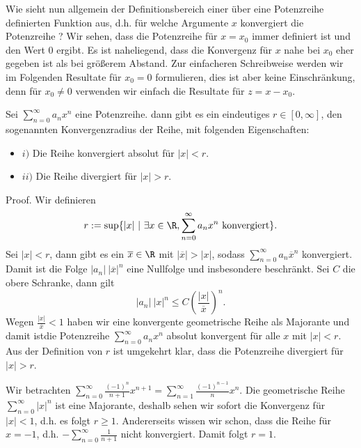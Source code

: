 \documentclass[letterpaper,10pt,english]{jupyterBook}
\begin{document}
Wie sieht nun allgemein der Definitionsbereich einer über eine Potenzreihe definierten Funktion aus, d.h. für welche Argumente \(x\) konvergiert die Potenzreihe ? Wir sehen, dass die Potenzreihe für \(x=x_0\) immer definiert ist und den Wert \(0\) ergibt. Es ist naheliegend, dass die Konvergenz für \(x\) nahe bei \(x_0\) eher gegeben ist als bei größerem Abstand. Zur einfacheren Schreibweise werden wir im Folgenden Resultate für \(x_0 = 0\) formulieren, dies ist aber keine Einschränkung, denn für \(x_0 \neq 0\) verwenden wir einfach die Resultate für \(z=x-x_0\).
\label{metrik/potenzreihen:theorem-1}
\begin{theorem}{}{}



Sei \(\sum_{n=0}^\infty a_n x^n\) eine Potenzreihe. dann gibt es ein eindeutiges \(r \in [0,\infty]\), den sogenannten Konvergenzradius der Reihe, mit folgenden Eigenschaften:
\begin{itemize}
\item {} 
\(i)\) Die Reihe konvergiert absolut für \(|x| < r\).

\item {} 
\(ii)\) Die Reihe divergiert für \(|x| > r\).

\end{itemize}
\end{theorem}

\begin{emphBox}{}{}
Proof.  Wir definieren
\begin{equation*}
 r:= \sup\{ |x| ~|~ \exists x \in \R, \sum_{n=0}^\infty a_n x^n \text{ konvergiert} \}.
\end{equation*}
Sei \(|x|<r\), dann gibt es ein \(\overline{x} \in \R\) mit \(|\overline{x}|>|x|\), sodass \(\sum_{n=0}^\infty a_n \overline{x}^n\) konvergiert. Damit ist die Folge \(|a_n|~ |\overline{x}|^n\) eine Nullfolge und insbesondere beschränkt. Sei \(C\) die obere Schranke, dann gilt
\begin{equation*}
|a_n|~ |x|^n \leq C \left( \frac{|x|}{\overline{x}} \right)^n.
\end{equation*}
Wegen \(\frac{|x|}{\overline{x}} < 1\) haben wir eine konvergente geometrische Reihe als Majorante und damit istdie Potenzreihe \(\sum_{n=0}^\infty a_n x^n \) absolut konvergent für alle \(x\) mit \(|x|<r\).
Aus der Definition von  \(r\) ist umgekehrt klar, dass die Potenzreihe divergiert für \(|x|>r\).
\end{emphBox}
\label{metrik/potenzreihen:example-2}
\begin{example}{}{}



Wir betrachten \(\sum_{n=0}^\infty \frac{(-1)^{n}}{n+1}x^{n+1} = \sum_{n=1}^\infty \frac{(-1)^{n-1}}{n}x^{n}. \)
Die geometrische Reihe \(\sum_{n=0}^\infty |x|^n\) ist eine Majorante, deshalb sehen wir sofort die Konvergenz für \(|x| < 1\), d.h. es folgt \(r \geq 1\). Andererseits wissen wir schon, dass die Reihe für \(x=-1\), d.h. \(-
\sum_{n=0}^\infty \frac{1}{n+1}\) nicht konvergiert. Damit folgt \(r=1\).
\end{example}
\end{document}
